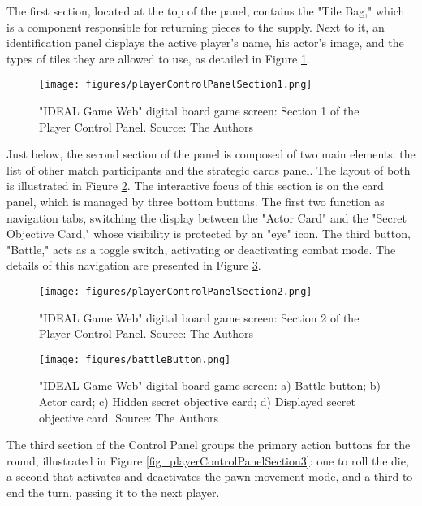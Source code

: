 \documentclass[english]{sbc2025}
\begin{document}
The first section, located at the top of the panel, contains the "Tile Bag," which is a component responsible for returning pieces to the supply. Next to it, an identification panel displays the active player's name, his actor's image, and the types of tiles they are allowed to use, as detailed in Figure \ref{fig_playerControlPanelSection1}.

\begin{figure}[h]
  \centering
  \texttt{[image: figures/playerControlPanelSection1.png]}
  \caption{  "IDEAL Game Web" digital board game screen: Section 1 of the Player Control Panel. Source: The Authors}
  \label{fig_playerControlPanelSection1}
\end{figure}


Just below, the second section of the panel is composed of two main elements: the list of other match participants and the strategic cards panel. The layout of both is illustrated in Figure \ref{fig_playerControlPanelSection2}. The interactive focus of this section is on the card panel, which is managed by three bottom buttons. The first two function as navigation tabs, switching the display between the "Actor Card" and the "Secret Objective Card," whose visibility is protected by an "eye" icon. The third button, "Battle," acts as a toggle switch, activating or deactivating combat mode. The details of this navigation are presented in Figure \ref{fig_battle}.

\begin{figure}[h]
  \centering
  \texttt{[image: figures/playerControlPanelSection2.png]}
  \caption{  "IDEAL Game Web" digital board game screen: Section 2 of the Player Control Panel. Source: The Authors}
  \label{fig_playerControlPanelSection2}
\end{figure}

\begin{figure}[h]
  \centering
  \texttt{[image: figures/battleButton.png]}
  \caption{  "IDEAL Game Web" digital board game screen: a) Battle button; b) Actor card; c) Hidden secret objective card; d) Displayed secret objective card. Source: The Authors}
  \label{fig_battle}
\end{figure}

The third section of the Control Panel groups the primary action buttons for the round, illustrated in Figure \ref{fig_playerControlPanelSection3}: one to roll the die, a second that activates and deactivates the pawn movement mode, and a third to end the turn, passing it to the next player.
\end{document}
